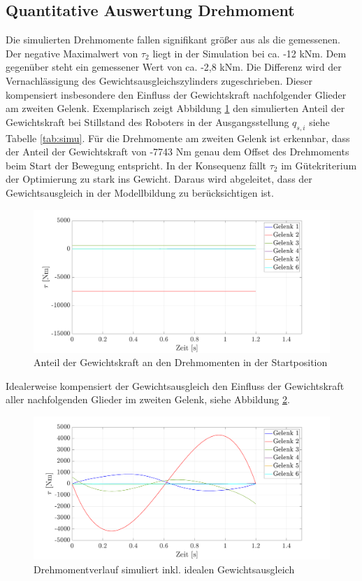 \subsection{Quantitative Auswertung Drehmoment}
Die simulierten Drehmomente fallen signifikant größer aus als die gemessenen. Der negative Maximalwert von $\tau_2$ liegt in der Simulation bei ca. -12 kNm. Dem gegenüber steht ein gemessener Wert  von ca. -2,8 kNm. Die Differenz wird der Vernachlässigung des Gewichtsausgleichszylinders zugeschrieben. Dieser kompensiert insbesondere den Einfluss der Gewichtskraft nachfolgender Glieder am zweiten Gelenk. Exemplarisch zeigt Abbildung \ref{fig:gewichtskraft} den simulierten Anteil der Gewichtskraft bei Stillstand des Roboters in der Ausgangsstellung $q_{s,i}$ siehe Tabelle \ref{tab:simu}. Für die Drehmomente am zweiten Gelenk ist erkennbar, dass der Anteil der Gewichtskraft von -7743 Nm genau dem  Offset des Drehmoments beim Start der Bewegung entspricht. In der Konsequenz fällt $\tau_2$ im Gütekriterium der Optimierung zu stark ins Gewicht. Daraus wird abgeleitet, dass der Gewichtsausgleich in der Modellbildung zu berücksichtigen ist. 
%
\begin{figure}[tbph]
	\centering
	\includegraphics[width=1\linewidth]{images/Gewichtskraft}
	\caption{Anteil der Gewichtskraft an den Drehmomenten in der Startposition}
	\label{fig:gewichtskraft}
\end{figure}
%
Idealerweise kompensiert der Gewichtsausgleich den Einfluss der Gewichtskraft aller nachfolgenden Glieder im zweiten Gelenk, siehe Abbildung \ref{fig:taumat-fgall}. 
%
\begin{figure}[tbph]
	\centering
	\includegraphics[width=1\linewidth]{images/taumat-fgall}
	\caption{Drehmomentverlauf simuliert inkl. idealen Gewichtsausgleich}
	\label{fig:taumat-fgall}
\end{figure}
